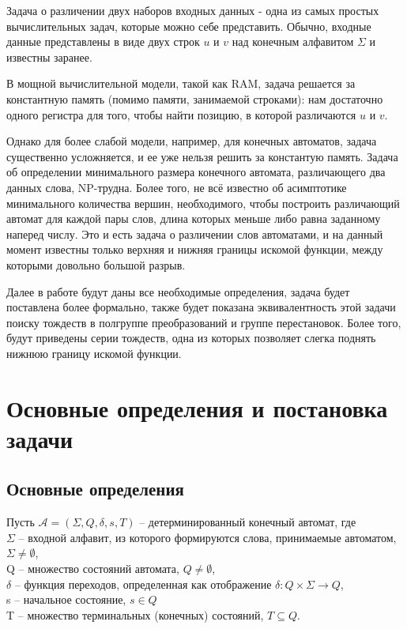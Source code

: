 
Задача о различении двух наборов входных данных - одна из самых простых вычислительных задач, которые можно себе представить. Обычно, входные данные представлены в виде двух строк $u$ и $v$ над конечным алфавитом $\Sigma$ и известны заранее. 

В мощной вычислительной модели, такой как RAM, задача решается за константную память (помимо памяти, занимаемой строками): нам достаточно одного регистра для того, чтобы найти позицию, в которой различаются $u$ и $v$. 

Однако для более слабой модели, например, для конечных автоматов, задача существенно усложняется, и ее уже нельзя решить за константую память. Задача об определении минимального размера конечного автомата, различающего два данных слова, NP-трудна. Более того, не всё известно об асимптотике минимального количества вершин, необходимого, чтобы построить различающий автомат для каждой пары слов, длина которых меньше либо равна заданному наперед числу. Это и есть задача о различении слов автоматами, и на данный момент известны только верхняя и нижняя границы искомой функции, между которыми довольно большой разрыв.

Далее в работе будут даны все необходимые определения, задача будет поставлена более формально, также будет показана эквивалентность этой задачи поиску тождеств в полгруппе преобразований и группе перестановок. Более того, будут приведены серии тождеств, одна из которых позволяет слегка поднять нижнюю границу искомой функции. 

\newpage
\section{Основные определения и постановка задачи}

\subsection{Основные определения}
Пусть $\mathscr{A} = (\Sigma, Q, \delta, s, T)$ – детерминированный конечный автомат, где 
\\ $\Sigma$ – входной алфавит, из которого формируются слова, принимаемые автоматом, $\Sigma \ne \emptyset$,
\\ Q – множество состояний автомата, $Q \ne \emptyset$,
\\ $\delta$ – функция переходов, определенная как отображение $\delta: Q \times \Sigma \rightarrow Q$, 
\\ s – начальное состояние, $s \in Q$
\\ T – множество терминальных (конечных) состояний, $T \subseteq Q$.

